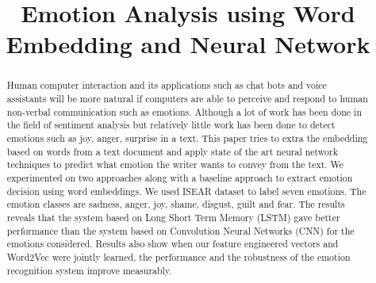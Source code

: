 \documentclass[conference]{IEEEtran}
\numberwithin{equation}{section}
\numberwithin{figure}{section}
\numberwithin{table}{section}
\begin{document}
%
\title{Emotion Analysis using Word Embedding and Neural Network}

\author{
}
\maketitle


\begin{abstract}
Human computer interaction and its applications such as chat bots and voice assistants  will be more natural if computers are able to perceive and respond to human non-verbal communication such as emotions. Although a lot of work has been done in the field of sentiment analysis but relatively little work has been done to detect emotions such as joy, anger, surprise in a text. This paper tries to extra the embedding based on words from a text document and apply state of the art neural network techniques to predict what emotion the writer wants to convey from the text. We experimented on two approaches along with a baseline approach to extract emotion decision using word embeddings. We used ISEAR dataset to label seven emotions. The emotion classes are sadness, anger, joy, shame, disgust, guilt and fear. The results reveals that the system based on Long Short Term Memory (LSTM) gave better performance than the system based on Convolution Neural Networks (CNN) for the emotions considered. Results also show when our feature engineered vectors and Word2Vec were jointly learned, the performance and the robustness of the emotion recognition system improve measurably. 
\end{abstract}
\end{document}
